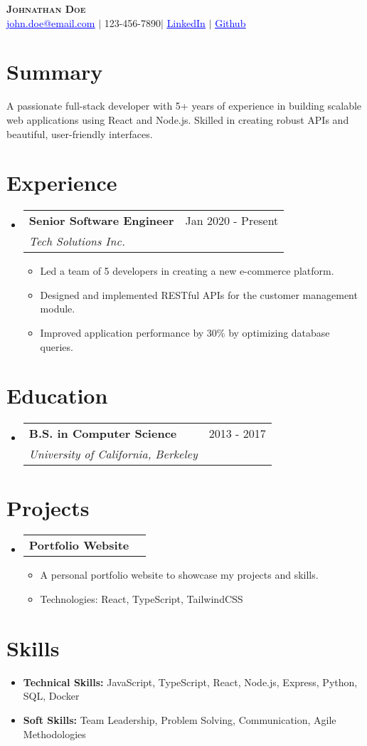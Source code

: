 \documentclass[letterpaper,11pt]{article}
\makeatletter
\newcommand{\fullName}{Johnathan Doe}
\newcommand{\phoneNumber}{123-456-7890}
\newcommand{\emailAddress}{john.doe@email.com}
\newcommand{\linkedinProfile}{https://linkedin.com/in/johndoe}
\newcommand{\githubProfile}{https://github.com/johndoe}
\newcommand{\professionalSummary}{
A passionate full-stack developer with 5+ years of experience in building scalable web applications using React and Node.js. Skilled in creating robust APIs and beautiful, user-friendly interfaces.
}
\newcommand{\universityName}{University of California, Berkeley}
\newcommand{\universityLocation}{}
\newcommand{\degreeName}{B.S. in Computer Science}
\newcommand{\educationDuration}{2013 - 2017}
\newcommand{\resumeItem}[1]{\item\small{{#1 \vspace{-2pt}}}}
\newcommand{\resumeSubheading}[4]{\vspace{-2pt}\item\begin{tabular*}{0.97\textwidth}[t]{l@{\extracolsep{\fill}}r}\textbf{#1} & #2 \\ \textit{\small#3} & \textit{\small #4} \\ \end{tabular*}\vspace{-7pt}}
\newcommand{\resumeProjectHeading}[2]{\item\begin{tabular*}{0.97\textwidth}{l@{\extracolsep{\fill}}r}\small#1 & #2 \\ \end{tabular*}\vspace{-7pt}}
\newcommand{\resumeSubItem}[1]{\resumeItem{#1}\vspace{-4pt}}
\newcommand{\resumeSubHeadingListStart}{\begin{itemize}[leftmargin=0.15in, label={}]}
\newcommand{\resumeSubHeadingListEnd}{\end{itemize}}
\newcommand{\resumeItemListStart}{\begin{itemize}}
\newcommand{\resumeItemListEnd}{\end{itemize}\vspace{-5pt}}
\makeatother
\begin{document}
\begin{center}
    \textbf{\Huge \scshape \fullName} \\ \vspace{1pt}
    \small \href{mailto:\emailAddress}{\textcolor{blue}{\underline{\emailAddress}}} $|$ \phoneNumber $|$
    \href{\linkedinProfile}{\textcolor{blue}{\underline{LinkedIn}}} $|$
    \href{\githubProfile}{\textcolor{blue}{\underline{Github}}}
\end{center}

\section{Summary}
\small{\professionalSummary}

\section{Experience}
  \resumeSubHeadingListStart
    \resumeSubheading{Senior Software Engineer}{Jan 2020 - Present}{Tech Solutions Inc.}{}
      \resumeItemListStart
        \resumeItem{Led a team of 5 developers in creating a new e-commerce platform.}
        \resumeItem{Designed and implemented RESTful APIs for the customer management module.}
        \resumeItem{Improved application performance by 30\% by optimizing database queries.}
      \resumeItemListEnd
  \resumeSubHeadingListEnd

\section{Education}
  \resumeSubHeadingListStart
    \resumeSubheading{\degreeName}{\educationDuration}{\universityName}{\universityLocation}
  \resumeSubHeadingListEnd

\section{Projects}
  \resumeSubHeadingListStart
    \resumeProjectHeading{\textbf{Portfolio Website}}{}
      \resumeItemListStart
        \resumeItem{A personal portfolio website to showcase my projects and skills.}
        \resumeItem{Technologies: React, TypeScript, TailwindCSS}
      \resumeItemListEnd
  \resumeSubHeadingListEnd

\section{Skills}
  \resumeSubHeadingListStart
    \resumeSubItem{\textbf{Technical Skills:} JavaScript, TypeScript, React, Node.js, Express, Python, SQL, Docker}
    \resumeSubItem{\textbf{Soft Skills:} Team Leadership, Problem Solving, Communication, Agile Methodologies}
  \resumeSubHeadingListEnd
\end{document}
